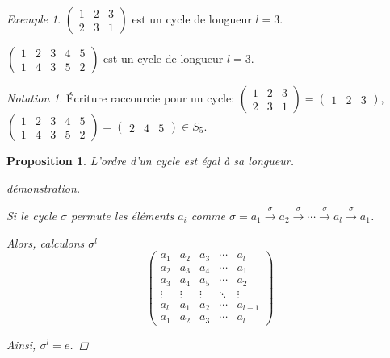 \documentclass{report}
\newtheorem*{prop}{Proposition}
\theoremstyle{definition}
\theoremstyle{remark}
\newtheorem*{exem}{Exemple}
\newtheorem*{nota}{Notation}
\begin{document}
	\begin{exem}
		$\begin{pmatrix}
			1&2&3\\2&3&1
		\end{pmatrix}$ est un cycle de longueur $l=3$.

		$\begin{pmatrix}
			1&2&3&4&5\\
			1&4&3&5&2
		\end{pmatrix}$ est un cycle de longueur $l=3$.
	\end{exem}
	\begin{nota}
		\'Ecriture raccourcie pour un cycle: $\begin{pmatrix}
			1&2&3\\2&3&1
		\end{pmatrix} = \begin{pmatrix}
			1&2&3
		\end{pmatrix}$, $\begin{pmatrix}
			1&2&3&4&5\\
			1&4&3&5&2
		\end{pmatrix} = \begin{pmatrix}
			2&4&5
		\end{pmatrix} \in S_5$.
	\end{nota}
	\begin{prop}
		L'ordre d'un cycle est \'egal \`a sa longueur.
		\begin{proof}[d\'emonstration]~

			Si le cycle $\sigma$ permute les \'el\'ements $a_i$ comme $\sigma = a_1 \xrightarrow{\sigma} a_2 \xrightarrow{\sigma} \dotsb \xrightarrow{\sigma} a_l \xrightarrow{\sigma} a_1$.

			Alors, calculons $\sigma^l$
			\[
			\begin{pmatrix}
				a_1&a_2&a_3&\dotsb&a_l\\
				a_2&a_3&a_4&\dotsb&a_1\\
				a_3&a_4&a_5&\dotsb&a_2\\
				\vdots&\vdots&\vdots&\ddots&\vdots\\
				a_l&a_1&a_2&\dotsb&a_{l-1}\\
				a_1&a_2&a_3&\dotsb&a_l
			\end{pmatrix}
			\]

			Ainsi, $\sigma^l=e$.
		\end{proof}
	\end{prop}
\end{document}
